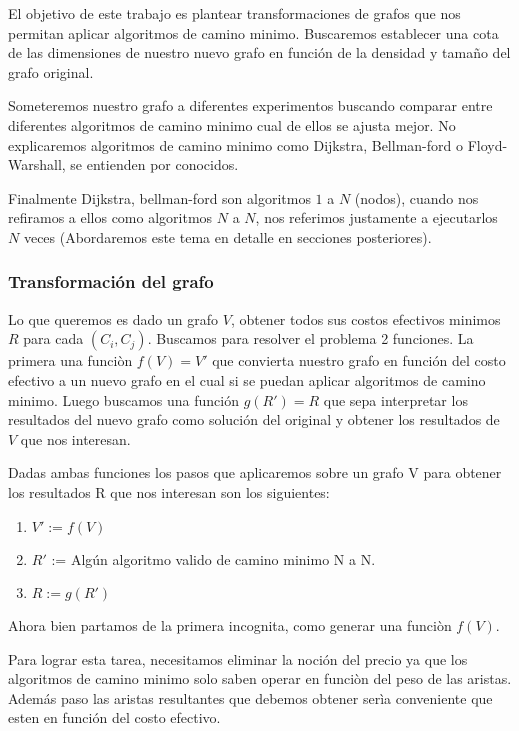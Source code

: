 \documentclass[12pt]{article}
\begin{document}
El objetivo de este trabajo es plantear transformaciones de grafos que nos permitan aplicar algoritmos de camino minimo. Buscaremos establecer una cota de las dimensiones de nuestro nuevo grafo en función de la densidad y tamaño del grafo original.

Someteremos nuestro grafo a diferentes experimentos buscando comparar entre diferentes algoritmos de camino minimo cual de ellos se ajusta mejor. No explicaremos algoritmos de camino minimo como Dijkstra, Bellman-ford o Floyd-Warshall, se entienden por conocidos.

Finalmente Dijkstra, bellman-ford son algoritmos $1$ a $N$ (nodos), cuando nos refiramos a ellos como algoritmos $N$ a $N$, nos referimos justamente a ejecutarlos $N$ veces (Abordaremos este tema en detalle en secciones posteriores).

\subsubsection*{Transformación del grafo}

Lo que queremos es dado un grafo $V$, obtener todos sus costos efectivos minimos $R$ para cada $(C_i, C_j)$. Buscamos para resolver el problema 2 funciones. La primera una funciòn $f(V) = V'$ que convierta nuestro grafo en función del costo efectivo a un nuevo grafo en el cual si se puedan aplicar algoritmos de camino minimo. Luego buscamos una función $g(R') = R$ que sepa interpretar los resultados del nuevo grafo como solución del original y obtener los resultados de $V$ que nos interesan.

Dadas ambas funciones los pasos que aplicaremos sobre un grafo V para obtener los resultados R que nos interesan son los siguientes:

\begin{enumerate}
	\item $V' := f(V)$
	\item $R'$ := Algún algoritmo valido de camino minimo N a N.
	\item $R := g(R')$
\end{enumerate}

Ahora bien partamos de la primera incognita, como generar una funciòn $f(V)$.

Para lograr esta tarea, necesitamos eliminar la noción del precio ya que los algoritmos de camino minimo solo saben operar en funciòn del peso de las aristas. Además paso las aristas resultantes que debemos obtener serìa conveniente que esten en función del costo efectivo.
\end{document}
